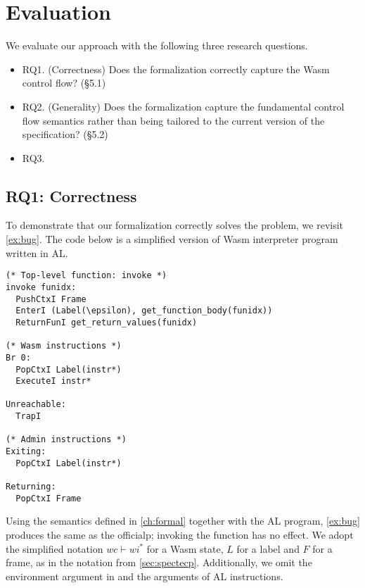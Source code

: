
\chapter{Evaluation}
\label{ch:eval}
\noindent

We evaluate our approach with the following three research questions.
\begin{itemize}
  \item RQ1. (Correctness) Does the formalization correctly capture the Wasm
    control flow? (\S 5.1)
  \item RQ2. (Generality) Does the formalization capture the fundamental
    control flow semantics rather than being tailored to the current version of
    the specification? (\S 5.2)
  \item RQ3. 
\end{itemize}

\section{RQ1: Correctness}
To demonstrate that our formalization correctly solves the problem, we revisit
\cref{ex:bug}.
The code below is a simplified version of Wasm interpreter program written in AL.
\begin{verbatim}
(* Top-level function: invoke *)
invoke funidx:
  PushCtxI Frame
  EnterI (Label(\epsilon), get_function_body(funidx))
  ReturnFunI get_return_values(funidx)

(* Wasm instructions *)
Br 0:
  PopCtxI Label(instr*)
  ExecuteI instr*

Unreachable:
  TrapI

(* Admin instructions *)
Exiting:
  PopCtxI Label(instr*)

Returning:
  PopCtxI Frame

\end{verbatim}
Using the semantics defined in \cref{ch:formal} together with the AL program,
\cref{ex:bug} produces the same as the officialp{}; invoking the function has
no effect.
We adopt the simplified notation $wc \vdash wi^*$ for a Wasm state, $L$ for a
label and $F$ for a frame, as in the notation from \cref{sec:spectecp}.
Additionally, we omit the environment argument in \algo{} and the arguments of AL
instructions.

